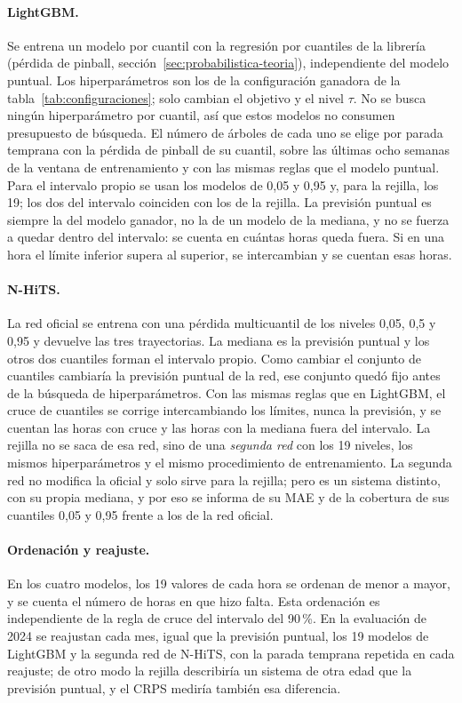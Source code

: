 \paragraph{LightGBM.} Se entrena un modelo por cuantil con la regresión por
cuantiles de la librería (pérdida de pinball, sección~\ref{sec:probabilistica-teoria}),
independiente del modelo puntual. Los hiperparámetros son los de la
configuración ganadora de la tabla~\ref{tab:configuraciones}; solo cambian el
objetivo y el nivel $\tau$. No se busca ningún hiperparámetro por cuantil, así
que estos modelos no consumen presupuesto de búsqueda. El número de árboles de
cada uno se elige por parada temprana con la pérdida de pinball de su
cuantil, sobre las últimas ocho semanas de la ventana de entrenamiento y con
las mismas reglas que el modelo puntual. Para el intervalo propio se usan los
modelos de 0,05 y 0,95 y, para la rejilla, los 19; los dos del intervalo
coinciden con los de la rejilla. La previsión puntual es siempre la del modelo
ganador, no la de un modelo de la mediana, y no se fuerza a quedar dentro del
intervalo: se cuenta en cuántas horas queda fuera. Si en una hora el límite
inferior supera al superior, se intercambian y se cuentan esas horas.

\paragraph{N-HiTS.} La red oficial se entrena con una pérdida multicuantil de
los niveles 0,05, 0,5 y 0,95 y devuelve las tres trayectorias. La mediana es
la previsión puntual y los otros dos cuantiles forman el intervalo propio.
Como cambiar el conjunto de cuantiles cambiaría la previsión puntual de la
red, ese conjunto quedó fijo antes de la búsqueda de hiperparámetros. Con las
mismas reglas que en LightGBM, el cruce de cuantiles se corrige intercambiando
los límites, nunca la previsión, y se cuentan las horas con cruce y las horas
con la mediana fuera del intervalo. La rejilla no se saca de esa red, sino de
una \emph{segunda red} con los 19 niveles, los mismos hiperparámetros y el
mismo procedimiento de entrenamiento. La segunda red no modifica la oficial y
solo sirve para la rejilla; pero es un sistema distinto, con su propia
mediana, y por eso se informa de su MAE y de la cobertura de sus cuantiles
0,05 y 0,95 frente a los de la red oficial.

\paragraph{Ordenación y reajuste.} En los cuatro modelos, los 19 valores de
cada hora se ordenan de menor a mayor, y se cuenta el número de horas en que
hizo falta. Esta ordenación es independiente de la regla de cruce del
intervalo del 90\,\%. En la evaluación de 2024 se reajustan cada mes, igual que
la previsión puntual, los 19 modelos de LightGBM y la segunda red de N-HiTS,
con la parada temprana repetida en cada reajuste; de otro modo la rejilla
describiría un sistema de otra edad que la previsión puntual, y el CRPS
mediría también esa diferencia.
